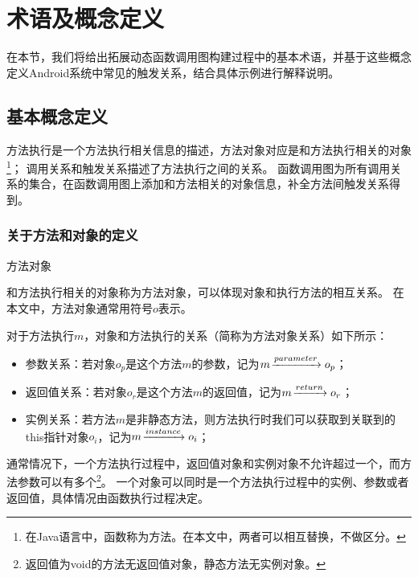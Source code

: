 \chapter{术语及概念定义}
\label{chp:definition}


在本节，我们将给出拓展动态函数调用图构建过程中的基本术语，并基于这些概念定义Android系统中常见的触发关系，结合具体示例进行解释说明。

\section{基本概念定义}
方法执行是一个方法执行相关信息的描述，方法对象对应是和方法执行相关的对象\footnote{在Java语言中，函数称为方法。在本文中，两者可以相互替换，不做区分。}；
调用关系和触发关系描述了方法执行之间的关系。
函数调用图为所有调用关系的集合，在函数调用图上添加和方法相关的对象信息，补全方法间触发关系得到\ecg 。

\subsection{关于方法和对象的定义}

\begin{Def}
	方法对象%
\end{Def}

和方法执行相关的对象称为方法对象，可以体现对象和执行方法的相互关系。
在本文中，方法对象通常用符号$o$表示。
	

	对于方法执行$m$，对象和方法执行的关系（简称为方法对象关系）如下所示：
	\begin{itemize}
				\setlength{\itemsep}{1pt}
				\setlength{\parskip}{0pt}
				\setlength{\parsep}{0pt}
		\item 参数关系：若对象$o_p$是这个方法$m$的参数，记为$m \joinrel\xrightarrow{parameter} o_p$；%
		\item 返回值关系：若对象$o_r$是这个方法$m$的返回值，记为$m \joinrel\xrightarrow{return} o_r$；%
		\item 实例关系：若方法$m$是非静态方法，则方法执行时我们可以获取到关联到的this指针对象$o_i$，记为$m \joinrel\xrightarrow{instance} o_i$；%
	\end{itemize}

通常情况下，一个方法执行过程中，返回值对象和实例对象不允许超过一个，而方法参数可以有多个\footnote{返回值为void的方法无返回值对象，静态方法无实例对象。}。
一个对象可以同时是一个方法执行过程中的实例、参数或者返回值，具体情况由函数执行过程决定。




